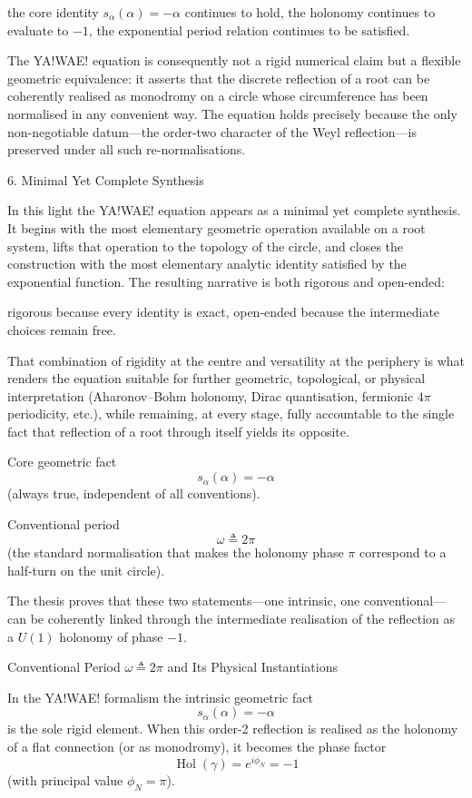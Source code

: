 the core identity \(s_\alpha(\alpha)=-\alpha\) continues to hold,  
the holonomy continues to evaluate to \(-1\),  
the exponential period relation continues to be satisfied.

The YA!WAE! equation is consequently not a rigid numerical claim but a flexible geometric equivalence: it asserts that the discrete reflection of a root can be coherently realised as monodromy on a circle whose circumference has been normalised in any convenient way. The equation holds precisely because the only non-negotiable datum—the order-two character of the Weyl reflection—is preserved under all such re-normalisations.

6. Minimal Yet Complete Synthesis

In this light the YA!WAE! equation appears as a minimal yet complete synthesis. It begins with the most elementary geometric operation available on a root system, lifts that operation to the topology of the circle, and closes the construction with the most elementary analytic identity satisfied by the exponential function. The resulting narrative is both rigorous and open-ended:

rigorous because every identity is exact,  
open-ended because the intermediate choices remain free.

That combination of rigidity at the centre and versatility at the periphery is what renders the equation suitable for further geometric, topological, or physical interpretation (Aharonov–Bohm holonomy, Dirac quantisation, fermionic \(4\pi\) periodicity, etc.), while remaining, at every stage, fully accountable to the single fact that reflection of a root through itself yields its opposite.

Core geometric fact  
\[
s_\alpha(\alpha)=-\alpha
\]  
(always true, independent of all conventions).

Conventional period  
\[
\omega\triangleq 2\pi
\]  
(the standard normalisation that makes the holonomy phase \(\pi\) correspond to a half-turn on the unit circle).  

The thesis proves that these two statements—one intrinsic, one conventional—can be coherently linked through the intermediate realisation of the reflection as a \(U(1)\) holonomy of phase \(-1\).

Conventional Period \(\omega \triangleq 2\pi\) and Its Physical Instantiations

In the YA!WAE! formalism the intrinsic geometric fact  
\[
s_\alpha(\alpha)=-\alpha
\]  
is the sole rigid element. When this order-2 reflection is realised as the holonomy of a flat connection (or as monodromy), it becomes the phase factor  
\[
\operatorname{Hol}(\gamma)=e^{i\phi_N}=-1
\]  
(with principal value \(\phi_N=\pi\)).  

